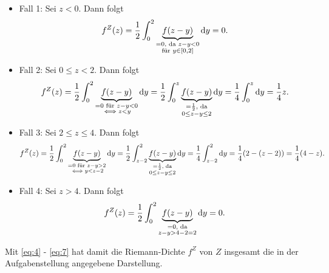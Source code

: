 \documentclass{exercise}
\begin{document}
    \begin{itemize}
        \item Fall 1: Sei \(z < 0\). Dann folgt
        \begin{equation}\label{eq:4}
            f^Z\parentheses*{z} = \frac{1}{2}\int_0^2 \underbrace{f\parentheses*{z - y}}_{\substack{= 0\text{, da }z - y < 0\\\text{für }y \in \brackets*{0, 2}}}\d y = 0.
        \end{equation}
        \item Fall 2: Sei \(0 \le z < 2\). Dann folgt
        \begin{equation}
            f^Z\parentheses*{z} = \frac{1}{2}\int_0^2 \underbrace{f\parentheses*{z - y}}_{\substack{= 0\text{ für }z - y < 0\\\iff z < y}}\d y = \frac{1}{2}\int_0^z \underbrace{f\parentheses*{z - y}}_{\substack{= \frac{1}{2}\text{, da}\\0 \le z - y \le 2}}\d y = \frac{1}{4}\int_0^z \d y = \frac{1}{4}z.
        \end{equation}
        \item Fall 3: Sei \(2 \le z \le 4\). Dann folgt
        \begin{equation}
            f^Z\parentheses*{z} = \frac{1}{2}\int_0^2 \underbrace{f\parentheses*{z - y}}_{\substack{= 0\text{ für }z - y > 2\\\iff y < z - 2}}\d y = \frac{1}{2}\int_{z - 2}^2 \underbrace{f\parentheses*{z - y}}_{\substack{= \frac{1}{2}\text{, da}\\0 \le z - y \le 2}}\d y = \frac{1}{4}\int_{z - 2}^2 \d y = \frac{1}{4}\parentheses*{2 - \parentheses*{z - 2}} = \frac{1}{4}\parentheses*{4 - z}.
        \end{equation}
        \item Fall 4: Sei \(z > 4\). Dann folgt
        \begin{equation}\label{eq:7}
            f^Z\parentheses*{z} = \frac{1}{2}\int_0^2 \underbrace{f\parentheses*{z - y}}_{\substack{= 0\text{, da}\\z - y > 4 - 2 = 2}}\d y = 0.
        \end{equation}
    \end{itemize}
    Mit \eqref{eq:4} - \eqref{eq:7} hat damit die Riemann-Dichte \(f^Z\) von \(Z\) insgesamt die in der Aufgabenstellung angegebene Darstellung.
\end{document}
